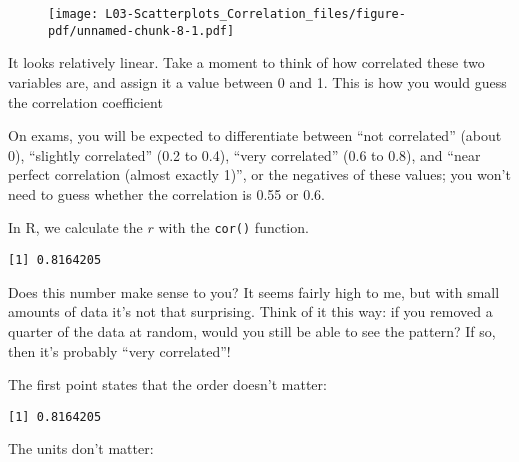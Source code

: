 \documentclass[
  letterpaper,
  DIV=11,
  numbers=noendperiod]{scrreprt}
\newenvironment{Shaded}{\begin{snugshade}}{\end{snugshade}}
\newcommand{\FunctionTok}[1]{\textcolor[rgb]{0.28,0.35,0.67}{#1}}
\newcommand{\NormalTok}[1]{\textcolor[rgb]{0.00,0.23,0.31}{#1}}
\newcommand{\SpecialCharTok}[1]{\textcolor[rgb]{0.37,0.37,0.37}{#1}}
\begin{document}
\begin{figure}[H]

{\centering \texttt{[image: L03-Scatterplots\_Correlation\_files/figure-pdf/unnamed-chunk-8-1.pdf]}

}

\end{figure}

It looks relatively linear. Take a moment to think of how correlated
these two variables are, and assign it a value between 0 and 1. This is
how you would guess the correlation coefficient

On exams, you will be expected to differentiate between ``not
correlated'' (about 0), ``slightly correlated'' (0.2 to 0.4), ``very
correlated'' (0.6 to 0.8), and ``near perfect correlation (almost
exactly 1)'', or the negatives of these values; you won't need to guess
whether the correlation is 0.55 or 0.6.

In R, we calculate the \(r\) with the \texttt{cor()} function.

\begin{Shaded}
\end{Shaded}

\begin{verbatim}
[1] 0.8164205
\end{verbatim}

Does this number make sense to you? It seems fairly high to me, but with
small amounts of data it's not that surprising. Think of it this way: if
you removed a quarter of the data at random, would you still be able to
see the pattern? If so, then it's probably ``very correlated''!

The first point states that the order doesn't matter:

\begin{Shaded}
\end{Shaded}

\begin{verbatim}
[1] 0.8164205
\end{verbatim}

The units don't matter:
\end{document}
